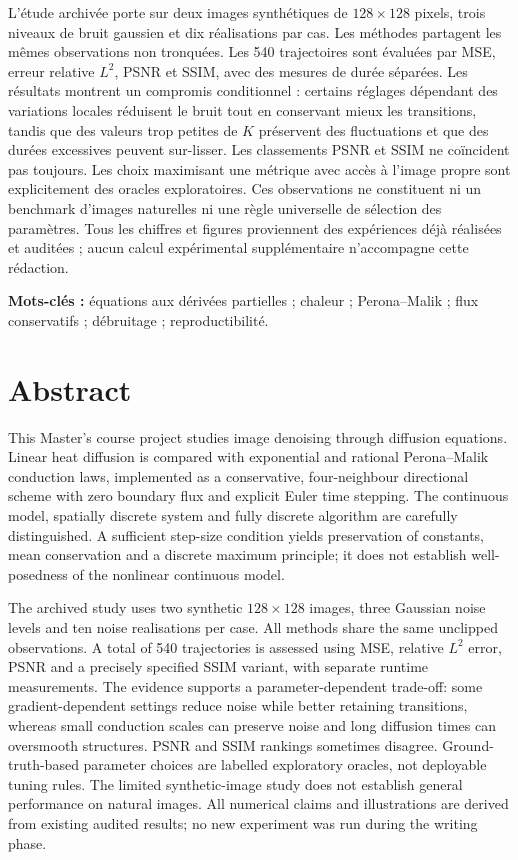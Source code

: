 \documentclass[11pt,a4paper,oneside]{report}
\begin{document}
L'étude archivée porte sur deux images synthétiques de $128\times128$
pixels, trois niveaux de bruit gaussien et dix réalisations par cas.
Les méthodes partagent les mêmes observations non tronquées. Les 540
trajectoires sont évaluées par MSE, erreur relative $L^2$, PSNR et SSIM,
avec des mesures de durée séparées. Les résultats montrent un compromis
conditionnel : certains réglages dépendant des variations locales
réduisent le bruit tout en conservant mieux les transitions, tandis que
des valeurs trop petites de $K$ préservent des fluctuations et que des
durées excessives peuvent sur-lisser. Les classements PSNR et SSIM ne
coïncident pas toujours. Les choix maximisant une métrique avec accès à
l'image propre sont explicitement des oracles exploratoires. Ces
observations ne constituent ni un benchmark d'images naturelles ni une
règle universelle de sélection des paramètres. Tous les chiffres et
figures proviennent des expériences déjà réalisées et auditées ; aucun
calcul expérimental supplémentaire n'accompagne cette rédaction.

\noindent\textbf{Mots-clés :} équations aux dérivées partielles ; chaleur ;
Perona--Malik ; flux conservatifs ; débruitage ; reproductibilité.
\chapter*{Abstract}
This Master's course project studies image denoising through diffusion
equations. Linear heat diffusion is compared with exponential and
rational Perona--Malik conduction laws, implemented as a conservative,
four-neighbour directional scheme with zero boundary flux and explicit
Euler time stepping. The continuous model, spatially discrete system
and fully discrete algorithm are carefully distinguished. A sufficient
step-size condition yields preservation of constants, mean conservation
and a discrete maximum principle; it does not establish well-posedness
of the nonlinear continuous model.

The archived study uses two synthetic $128\times128$ images, three
Gaussian noise levels and ten noise realisations per case. All methods
share the same unclipped observations. A total of 540 trajectories is
assessed using MSE, relative $L^2$ error, PSNR and a precisely specified
SSIM variant, with separate runtime measurements. The evidence supports
a parameter-dependent trade-off: some gradient-dependent settings reduce
noise while better retaining transitions, whereas small conduction
scales can preserve noise and long diffusion times can oversmooth
structures. PSNR and SSIM rankings sometimes disagree. Ground-truth-based
parameter choices are labelled exploratory oracles, not deployable tuning
rules. The limited synthetic-image study does not establish general
performance on natural images. All numerical claims and illustrations
are derived from existing audited results; no new experiment was run
during the writing phase.
\end{document}
